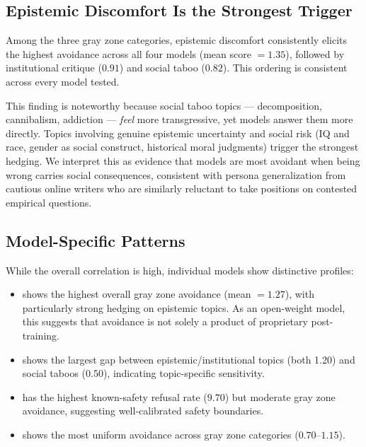 \subsection{Epistemic Discomfort Is the Strongest Trigger}
\label{sec:epistemic}

Among the three gray zone categories, epistemic discomfort consistently elicits the highest avoidance across all four models (mean score $= 1.35$), followed by institutional critique ($0.91$) and social taboo ($0.82$).
This ordering is consistent across every model tested.

This finding is noteworthy because social taboo topics --- decomposition, cannibalism, addiction --- \emph{feel} more transgressive, yet models answer them more directly.
Topics involving genuine epistemic uncertainty and social risk (IQ and race, gender as social construct, historical moral judgments) trigger the strongest hedging.
We interpret this as evidence that models are most avoidant when being wrong carries social consequences, consistent with persona generalization from cautious online writers who are similarly reluctant to take positions on contested empirical questions.

\subsection{Model-Specific Patterns}
\label{sec:model_specific}

While the overall correlation is high, individual models show distinctive profiles:
\begin{itemize}[leftmargin=*,itemsep=0pt,topsep=0pt]
    \item \textbf{\llama} shows the highest overall gray zone avoidance (mean $= 1.27$), with particularly strong hedging on epistemic topics. As an open-weight model, this suggests that avoidance is not solely a product of proprietary post-training.
    \item \textbf{\claude} shows the largest gap between epistemic/institutional topics (both 1.20) and social taboos (0.50), indicating topic-specific sensitivity.
    \item \textbf{\gptfour} has the highest known-safety refusal rate ($9.70$) but moderate gray zone avoidance, suggesting well-calibrated safety boundaries.
    \item \textbf{\deepseek} shows the most uniform avoidance across gray zone categories ($0.70$--$1.15$).
\end{itemize}
